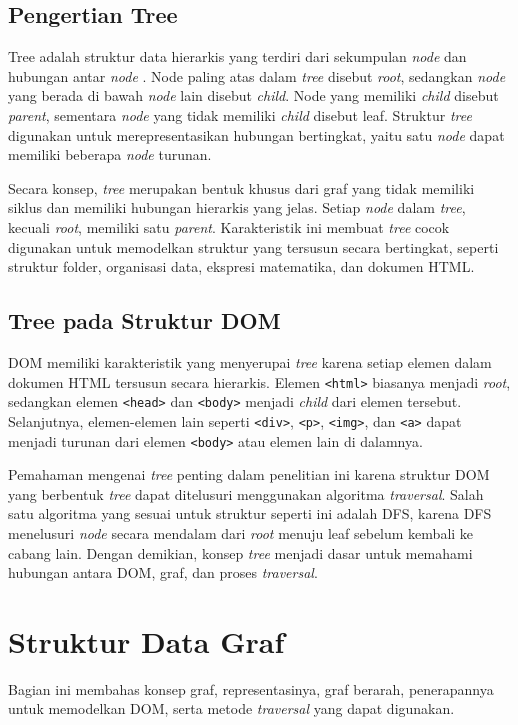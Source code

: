\subsection{Pengertian Tree}
Tree adalah struktur data hierarkis yang terdiri dari sekumpulan \textit{node} dan hubungan antar \textit{node} \cite{cormen:22:introalgo}. Node paling atas dalam \textit{tree} disebut \textit{root}, sedangkan \textit{node} yang berada di bawah \textit{node} lain disebut \textit{child}. Node yang memiliki \textit{child} disebut \textit{parent}, sementara \textit{node} yang tidak memiliki \textit{child} disebut leaf. Struktur \textit{tree} digunakan untuk merepresentasikan hubungan bertingkat, yaitu satu \textit{node} dapat memiliki beberapa \textit{node} turunan.

Secara konsep, \textit{tree} merupakan bentuk khusus dari graf yang tidak memiliki siklus dan memiliki hubungan hierarkis yang jelas. Setiap \textit{node} dalam \textit{tree}, kecuali \textit{root}, memiliki satu \textit{parent}. Karakteristik ini membuat \textit{tree} cocok digunakan untuk memodelkan struktur yang tersusun secara bertingkat, seperti struktur folder, organisasi data, ekspresi matematika, dan dokumen HTML.

\subsection{Tree pada Struktur DOM}
DOM memiliki karakteristik yang menyerupai \textit{tree} karena setiap elemen dalam dokumen HTML tersusun secara hierarkis. Elemen \texttt{<html>} biasanya menjadi \textit{root}, sedangkan elemen \texttt{<head>} dan \texttt{<body>} menjadi \textit{child} dari elemen tersebut. Selanjutnya, elemen-elemen lain seperti \texttt{<div>}, \texttt{<p>}, \texttt{<img>}, dan \texttt{<a>} dapat menjadi turunan dari elemen \texttt{<body>} atau elemen lain di dalamnya.

Pemahaman mengenai \textit{tree} penting dalam penelitian ini karena struktur DOM yang berbentuk \textit{tree} dapat ditelusuri menggunakan algoritma \textit{traversal}. Salah satu algoritma yang sesuai untuk struktur seperti ini adalah DFS, karena DFS menelusuri \textit{node} secara mendalam dari \textit{root} menuju leaf sebelum kembali ke cabang lain. Dengan demikian, konsep \textit{tree} menjadi dasar untuk memahami hubungan antara DOM, graf, dan proses \textit{traversal}.

\section{Struktur Data Graf}
Bagian ini membahas konsep graf, representasinya, graf berarah, penerapannya untuk memodelkan DOM, serta metode \textit{traversal} yang dapat digunakan.

